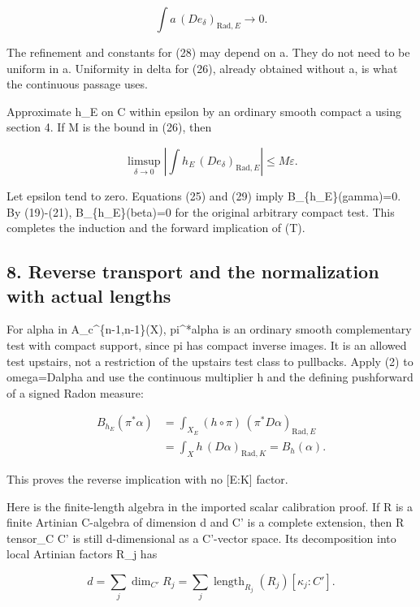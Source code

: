\documentclass[
  10pt,
]{article}
\begin{document}
\[
 \int a\,(D e_\delta)_{\mathrm{Rad},E}\longrightarrow0.       \tag{28}
\]

The refinement and constants for (28) may depend on a. They do not need
to be uniform in a. Uniformity in delta for (26), already obtained
without a, is what the continuous passage uses.

Approximate h\_E on C within epsilon by an ordinary smooth compact a
using section 4. If M is the bound in (26), then

\[
 \limsup_{\delta\to0}
 \left|\int h_E\,(D e_\delta)_{\mathrm{Rad},E}\right|
 \leq M\varepsilon.                                       \tag{29}
\]

Let epsilon tend to zero. Equations (25) and (29) imply
B\_\{h\_E\}(gamma)=0. By (19)-(21), B\_\{h\_E\}(beta)=0 for the original
arbitrary compact test. This completes the induction and the forward
implication of (T).

\subsection{8. Reverse transport and the normalization with actual
lengths}\label{reverse-transport-and-the-normalization-with-actual-lengths}

For alpha in A\_c\^{}\{n-1,n-1\}(X), pi\^{}*alpha is an ordinary smooth
complementary test with compact support, since pi has compact inverse
images. It is an allowed test upstairs, not a restriction of the
upstairs test class to pullbacks. Apply (2) to omega=Dalpha and use the
continuous multiplier h and the defining pushforward of a signed Radon
measure:

\[
 \begin{split}
 B_{h_E}(\pi^*\alpha)
 &=\int_{X_E}(h\circ\pi)\,(\pi^*D\alpha)_{\mathrm{Rad},E}\\
 &=\int_X h\,(D\alpha)_{\mathrm{Rad},K}=B_h(\alpha).
 \end{split}                                               \tag{30}
\]

This proves the reverse implication with no {[}E:K{]} factor.

Here is the finite-length algebra in the imported scalar calibration
proof. If R is a finite Artinian C-algebra of dimension d and C' is a
complete extension, then R tensor\_C C' is still d-dimensional as a
C'-vector space. Its decomposition into local Artinian factors R\_j has

\[
 d=\sum_j\dim_{C'}R_j
   =\sum_j\operatorname{length}_{R_j}(R_j)
                         [\kappa_j:C'].                    \tag{31}
\]
\end{document}
